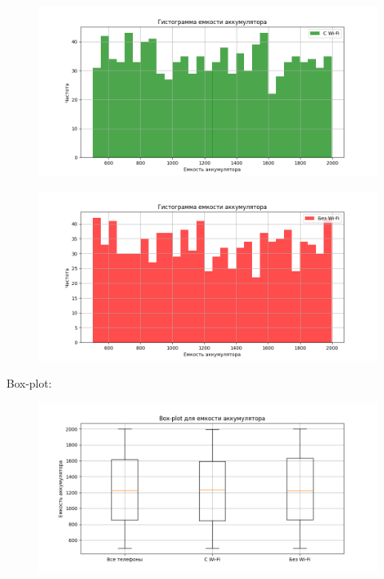 \documentclass{article}
\begin{document}
\begin{figure}[H]
      \centering
      \includegraphics[width=0.5\linewidth]{Python/hist-wi-fi}\label{fig:figure8}
\end{figure}

\begin{figure}[H]
      \centering
      \includegraphics[width=0.5\linewidth]{Python/hist-without-wi-fi}\label{fig:figure9}
\end{figure}

Box-plot:
\begin{figure}[H]
      \centering
      \includegraphics[width=0.5\linewidth]{Python/box-plot}\label{fig:figure10}
\end{figure}
\end{document}
